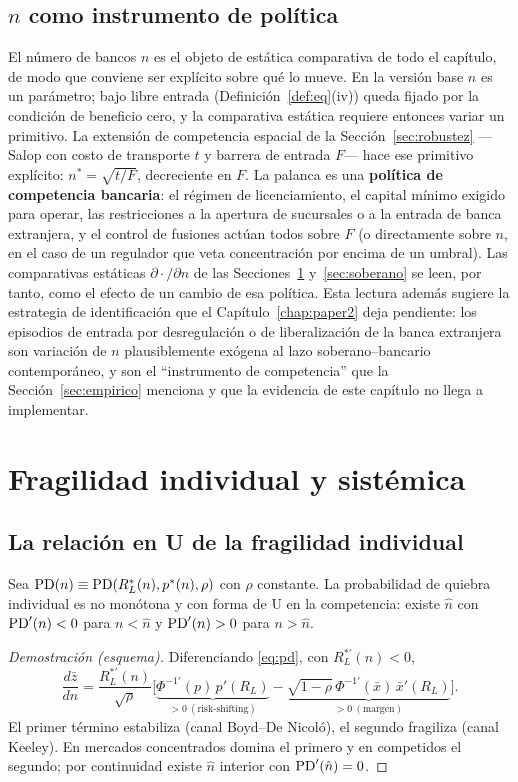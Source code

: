 \subsection{\texorpdfstring{$n$}{n} como instrumento de política}\label{sec:npolitica}
El número de bancos $n$ es el objeto de estática comparativa de todo el capítulo, de
modo que conviene ser explícito sobre qué lo mueve. En la versión base $n$ es un
parámetro; bajo libre entrada (Definición~\ref{def:eq}(iv)) queda fijado por la
condición de beneficio cero, y la comparativa estática requiere entonces variar un
primitivo. La extensión de competencia espacial de la Sección~\ref{sec:robustez}
—Salop con costo de transporte $t$ y barrera de entrada $F$— hace ese primitivo
explícito: $n^{*}=\sqrt{t/F}$, decreciente en $F$. La palanca es una \textbf{política
de competencia bancaria}: el régimen de licenciamiento, el capital mínimo exigido
para operar, las restricciones a la apertura de sucursales o a la entrada de banca
extranjera, y el control de fusiones actúan todos sobre $F$ (o directamente sobre
$n$, en el caso de un regulador que veta concentración por encima de un umbral). Las
comparativas estáticas $\partial\cdot/\partial n$ de las Secciones~\ref{sec:sistemico}
y~\ref{sec:soberano} se leen, por tanto, como el efecto de un cambio de esa política.
Esta lectura además sugiere la estrategia de identificación que el Capítulo~\ref{chap:paper2}
deja pendiente: los episodios de entrada por desregulación o de liberalización de la
banca extranjera son variación de $n$ plausiblemente exógena al lazo
soberano--bancario contemporáneo, y son el ``instrumento de competencia'' que la
Sección~\ref{sec:empirico} menciona y que la evidencia de este capítulo no llega a
implementar.

\section{Fragilidad individual y sistémica}\label{sec:sistemico}

\subsection{La relación en U de la fragilidad individual}
\begin{proposition}\label{prop:U}
Sea $\mathrm{PD}(n)\equiv\mathrm{PD}(R_L^*(n),p^*(n),\rho)$ con $\rho$ constante. La probabilidad de quiebra individual es no monótona y con forma de U en la competencia: existe $\hat n$ con $\mathrm{PD}'(n)<0$ para $n<\hat n$ y $\mathrm{PD}'(n)>0$ para $n>\hat n$.
\end{proposition}
\begin{proof}[Demostración (esquema)]
Diferenciando \eqref{eq:pd}, con $R_L^{*\prime}(n)<0$,
\[
\frac{d\bar z}{dn}=\frac{R_L^{*\prime}(n)}{\sqrt{\rho}}\Big[\underbrace{\Phi^{-1\prime}(p)\,p'(R_L)}_{>0\ (\text{risk-shifting})}-\underbrace{\sqrt{1-\rho}\,\Phi^{-1\prime}(\bar x)\,\bar x'(R_L)}_{>0\ (\text{margen})}\Big].
\]
El primer término estabiliza (canal Boyd--De Nicoló), el segundo fragiliza (canal Keeley). En mercados concentrados domina el primero y en competidos el segundo; por continuidad existe $\hat n$ interior con $\mathrm{PD}'(\hat n)=0$.
\end{proof}

